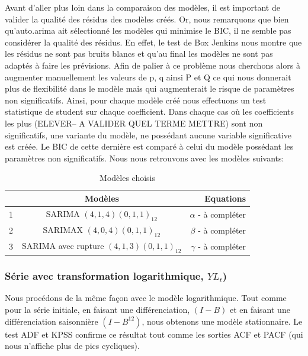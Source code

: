 \documentclass[12pt,a4paper]{book}
\newcommand{\1}{\mathds{1}}
\begin{document}
Avant d'aller plus loin dans la comparaison des modèles, il est important de valider la qualité des résidus des modèles créés. Or, nous remarquons que bien qu'auto.arima ait sélectionné les modèles qui minimise le BIC, il ne semble pas considérer la qualité des résidus. En effet, le test de Box Jenkins nous montre que les résidus ne sont pas bruits blancs et qu'au final les modèles ne sont pas adaptés à faire les prévisions. Afin de palier à ce problème nous cherchons alors à augmenter manuellement les valeurs de p, q ainsi P et Q ce qui nous donnerait plus de flexibilité dans le modèle mais qui augmenterait le risque de paramètres non significatifs. Ainsi, pour chaque modèle créé nous effectuons un test statistique de student sur chaque coefficient. Dans chaque cas où les coefficients les plus (ELEVER-- A VALIDER QUEL TERME METTRE) sont non significatifs, une variante du modèle, ne possédant aucune variable significative est créée. Le BIC de cette dernière est comparé à celui du modèle possédant les paramètres non significatifs. Nous nous retrouvons avec les modèles suivants:

\begin{table}[h!]
  \begin{center}
    \caption{Modèles choisis}
    \label{tab:table1}
    \begin{tabular}{l|c|r} %
      \ & \textbf{Modèles} & \textbf{Equations}\\
      \hline
      1 & SARIMA $(4,1,4)(0,1,1)_{12}$ & $\alpha$ - à compléter\\
      2 & SARIMAX $(4,0,4)(0,1,1)_{12}$& $\beta$ - à compléter\\
      3 & SARIMA avec rupture $(4,1,3)(0,1,1)_{12}$ & $\gamma$ - à compléter\\
    \end{tabular}
  \end{center}
\end{table}



\vspace{5 mm}
\subsubsection{Série avec transformation logarithmique, $YL_t$)}

Nous procédons de la même façon avec le modèle logarithmique. Tout comme pour la série initiale, en faisant une différenciation, $(I-B)$ et en faisant une différenciation saisonnière $(I-B^{12})$, nous obtenons une modèle stationnaire. Le test ADF et KPSS confirme ce résultat tout comme les sorties ACF et PACF (qui nous n'affiche plus de pics cycliques). 
\end{document}
